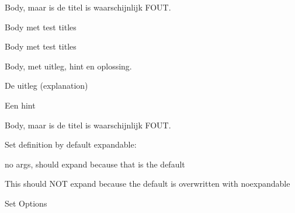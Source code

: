 \documentclass{ximera}
\begin{document}
\begin{definition}
Body, maar is de titel is waarschijnlijk FOUT. 
\end{definition}

\begin{definition}[Titel1, title={titel met toekenning aan 'titl'}, noexpandable, onbekendeoptiewordttitel]
Body met test titles
\end{definition}

\begin{definition}[Titel1, title={titel met toekenning aan 'title'}, noexpandable]
Body met test titles
\end{definition}


\begin{definition}
Body, met uitleg, hint en oplossing.
\begin{explanation} De uitleg (explanation) \end{explanation}
\begin{hint}        Een hint \end{hint}
\end{definition}

\begin{definition}[{Titel, met komma's, en, haakjes maar zonder title=}]
  Body, maar is de titel is waarschijnlijk FOUT. 
\end{definition}


Set definition by default expandable:

\begin{definition}[Veelterm]
   no args, should expand because that is the default
\end{definition}

\begin{definition}[title={Veelterm, with noexpandable option}, noexpandable]
   This should NOT expand because the default is overwritten with noexpandable
\end{definition}

Set Options
    
\end{document}
